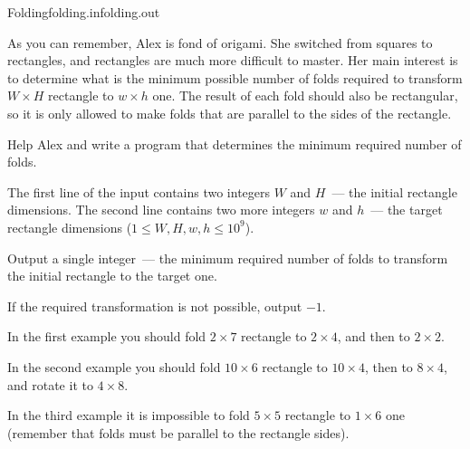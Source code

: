 \begin{problem}{Folding}{folding.in}{folding.out}{\timeLimit}


As you can remember, Alex is fond of origami. She switched from squares
to rectangles, and rectangles are much more difficult to master.
Her main interest is to determine what is the minimum possible number of
folds required to transform $W \times H$ rectangle to $w \times h$ one.
The result of each fold should also be rectangular, so it is only allowed to
make folds that are parallel to the sides of the rectangle.

Help Alex and write a program that determines the minimum required number of folds.

\InputFile

The first line of the input contains two integers $W$ and $H$~---
the initial rectangle dimensions.  
The second line contains two more integers $w$ and $h$~---
the target rectangle dimensions ($1 \le W, H, w, h \le 10^9$).

\OutputFile

Output a single integer~--- the minimum required number of folds
to transform the initial rectangle to the target one.

If the required transformation is not possible, output $-1$.

\Examples

\begin{example}
%
%
%
\end{example}

In the first example you should fold $2\times7$ rectangle to $2\times4$, 
and then to $2\times2$.

In the second example you should fold $10\times6$ rectangle to $10\times4$, 
then to $8\times4$, and rotate it to $4\times8$.

In the third example it is impossible to fold $5\times5$ rectangle to $1\times6$ one
(remember that folds must be parallel to the rectangle sides).

\end{problem}
